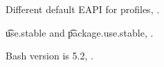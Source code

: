 \begin{compactitem}
\item Different default EAPI for profiles, .
\item \t{use.stable} and \t{package.use.stable}, .
\item Bash version is 5.2, .
\end{compactitem}



